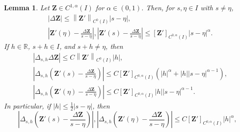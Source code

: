 \documentclass[11pt,reqno]{amsart}
\theoremstyle{plain}
\newtheorem{lemma}[theorem]{Lemma}
\theoremstyle{definition}
\numberwithin{equation}{section}
\newcommand{\paren}[1]{\left(#1\right)}
\newcommand{\bm}[1]{\boldsymbol{#1}}
\newcommand{\abs}[1]{\left\lvert #1 \right\rvert}
\newcommand{\norm}[1]{\left\lVert #1 \right\rVert}
\newcommand{\R}{\mathbb{R}}
\newcommand{\ci}[1]{C^{#1}(I)}
\begin{document}
\begin{lemma}\label{lem:diff-est}
Let $\bm Z \in \ci{1,\alpha}$ for $\alpha\in(0,1)$. Then, for
$s,\eta\in I$ with $s\ne\eta$,
\begin{align}
    &\abs{\Delta \bm Z} \le \norm{\bm Z' }_{\ci{0}} |s-\eta|, \\
    &\abs{\bm Z '(\eta) - \frac{\Delta \bm Z }{s-\eta}}, \abs{\bm Z '(s) - \frac{\Delta \bm Z }{s-\eta}} \le [\bm Z ']_{\ci{0,\alpha}} |s-\eta|^\alpha.\label{eqn:divided-difference-remainder}
\end{align}
If $h\in\R$, $s+h\in I$, and $s+h\ne\eta$, then
\begin{align}
    &|\Delta_{s,h}\Delta \bm Z | \le C\norm{\bm Z' }_{\ci{0}} \abs{h}, \\
    &\abs{\Delta_{s,h} \paren{\bm Z'(s) - \frac{\Delta \bm Z}{s-\eta}} }   \le C [\bm Z ']_{\ci{0,\alpha}}\paren{\abs{h}^\alpha+\abs{h}\abs{s-\eta}^{\alpha-1}},\\
    &\abs{\Delta_{s,h} \paren{\bm Z'(\eta) - \frac{\Delta \bm Z}{s-\eta}} }  \le C [\bm Z ']_{\ci{0,\alpha}}\abs{h}\abs{s-\eta}^{\alpha-1}.
\end{align}
In particular, if $\abs{h}\le \frac{1}{2}\abs{s-\eta}$, then
\begin{equation}\label{eqn:diff-est1}
    \abs{\Delta_{s,h} \paren{\bm Z'(s) - \frac{\Delta \bm Z}{s-\eta}} }, \abs{\Delta_{s,h} \paren{\bm Z'(\eta) - \frac{\Delta \bm Z}{s-\eta}} }  \le C [\bm Z ']_{\ci{0,\alpha}} \abs{h}^\alpha ,
\end{equation}
\end{lemma}
\end{document}
